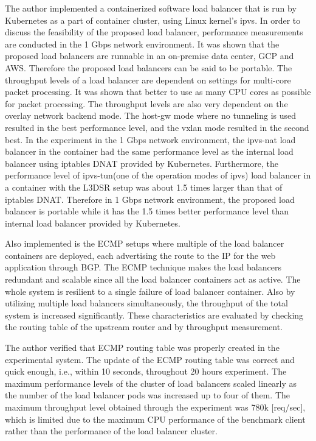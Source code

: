 The author implemented a containerized software load balancer that is run by Kubernetes as a part of container cluster, using Linux kernel's ipvs.
In order to discuss the feasibility of the proposed load balancer, performance measurements are conducted in the 1 Gbps network environment.
It was shown that the proposed load balancers are runnable in an on-premise data center, GCP and AWS.
Therefore the proposed load balancers can be said to be portable.
The throughput levels of a load balancer are dependent on settings for multi-core packet processing.
It was shown that better to use as many CPU cores as possible for packet processing.
The throughput levels are also very dependent on the overlay network backend mode.
The host-gw mode where no tunneling is used resulted in the best performance level, and the vxlan mode resulted in the second best.
In the experiment in the 1 Gbps network environment, the ipvs-nat load balancer in the container had the same performance level as the internal load balancer using iptables DNAT provided by Kubernetes.
Furthermore, the performance level of ipvs-tun(one of the operation modes of ipvs) load balancer in a container with the L3DSR setup was about 1.5 times larger than that of iptables DNAT.
Therefore in 1 Gbps network environment, the proposed load balancer is portable while it has the 1.5 times better performance level than internal load balancer provided by Kubernetes.

Also implemented is the ECMP setups where multiple of the load balancer containers are deployed, each advertising the route to the IP for the web application through BGP.
The ECMP technique makes the load balancers redundant and scalable since all the load balancer containers act as active.
The whole system is resilient to a single failure of load balancer container.
Also by utilizing multiple load balancers simultaneously, the throughput of the total system is increased significantly.
These characteristics are evaluated by checking the routing table of the upstream router and by throughput measurement.

%
The author verified that ECMP routing table was properly created in the experimental system.
The update of the ECMP routing table was correct and quick enough, i.e., within 10 seconds, throughout 20 hours experiment.
The maximum performance levels of the cluster of load balancers scaled linearly as the number of the load balancer pods was increased up to four of them.
The maximum throughput level obtained through the experiment was 780k [req/sec], which is limited due to the maximum CPU performance of the benchmark client rather than the performance of the load balancer cluster.

